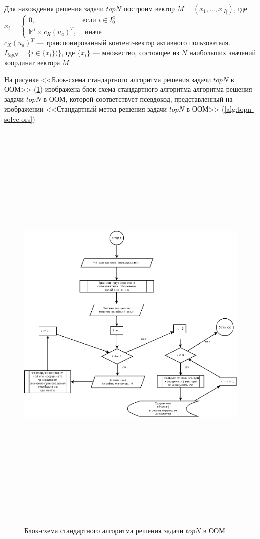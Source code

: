 Для нахождения решения задачи $topN$ построим вектор
$\mathit{M} = (\overline{x}_1,...,\overline{x}_|I|)$, где
$
\overline{x}_i =
\begin{cases}
	0, &\text{если  $i \in I^a_0 $}\\
\mathbb{M}^i \times c_X(u_a)^T, &\text{ иначе }
\end{cases}
$\\
$c_X(u_a)^T$ --- транспонированный контент-вектор активного пользователя.
$I_{topN} = \{ i \in \{\overline{x}_i\} )\}$, где
$\{\overline{x}_i\}$ --- множество, состоящее из $N$ наибольших значений
координат вектора $\mathit{M}$.

На рисунке <<Блок-схема стандартного алгоритма решения задачи $topN$ в ООМ>> (\ref{dia:topn-solve-ors}) изображена блок-схема стандартного
алгоритма алгоритма решения задачи $topN$ в ООМ, которой соответствует
псевдокод, представленный на изображении <<Стандартный метод решения задачи $topN$ в ООМ>> (\ref{alg:topn-solve-ors})
\begin{figure}[htb]
	\caption{Блок-схема стандартного алгоритма решения задачи $topN$ в ООМ}
\begin{center}
	\label{dia:topn-solve-ors}
 \includegraphics[width=7in,height=8in]{pics/algs/topn-ors.png}
\end{center}
\end{figure}


